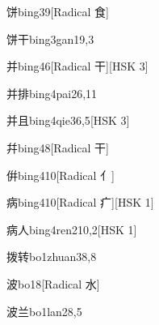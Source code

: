 \begin{entry}{饼}{bing3}{9}[Radical 食]
\end{entry}

\begin{entry}{饼干}{bing3gan1}{9,3}
\end{entry}

\begin{entry}{并}{bing4}{6}[Radical 干][HSK 3]
\end{entry}

\begin{entry}{并排}{bing4pai2}{6,11}
\end{entry}

\begin{entry}{并且}{bing4qie3}{6,5}[HSK 3]
\end{entry}

\begin{entry}{幷}{bing4}{8}[Radical 干]
\end{entry}

\begin{entry}{倂}{bing4}{10}[Radical 亻]
\end{entry}

\begin{entry}{病}{bing4}{10}[Radical 疒][HSK 1]
\end{entry}

\begin{entry}{病人}{bing4ren2}{10,2}[HSK 1]
\end{entry}

\begin{entry}{拨转}{bo1zhuan3}{8,8}
\end{entry}

\begin{entry}{波}{bo1}{8}[Radical 水]
\end{entry}

\begin{entry}{波兰}{bo1lan2}{8,5}
\end{entry}

